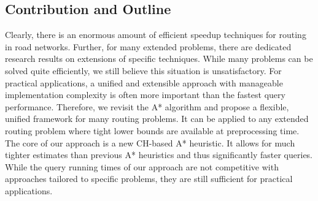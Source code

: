 \documentclass[manuscript,review]{acmart}
\begin{document}

\subsection{Contribution and Outline}

Clearly, there is an enormous amount of efficient speedup techniques for routing in road networks.
Further, for many extended problems, there are dedicated research results on extensions of specific techniques.
While many problems can be solved quite efficiently, we still believe this situation is unsatisfactory.
For practical applications, a unified and extensible approach with manageable implementation complexity is often more important than the fastest query performance.
Therefore, we revisit the A* algorithm and propose a flexible, unified framework for many routing problems.
It can be applied to any extended routing problem where tight lower bounds are available at preprocessing time.
The core of our approach is a new CH-based A* heuristic.
It allows for much tighter estimates than previous A* heuristics and thus significantly faster queries.
While the query running times of our approach are not competitive with approaches tailored to specific problems, they are still sufficient for practical applications.
\end{document}

